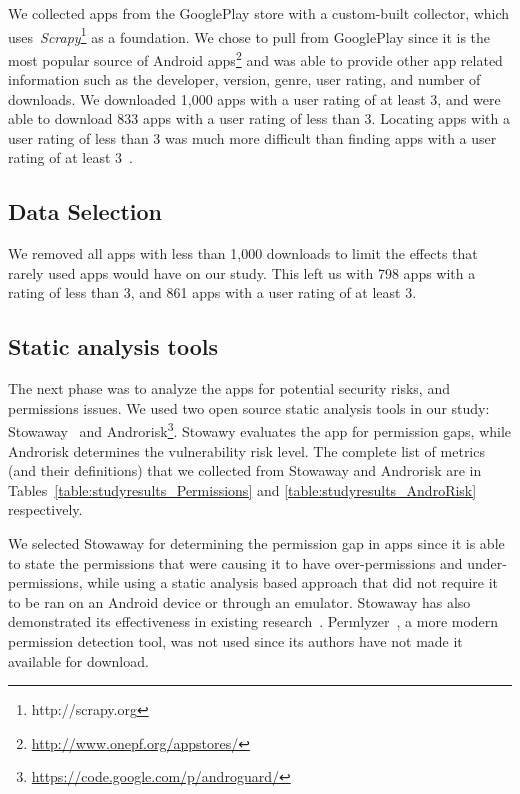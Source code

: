 
We collected apps from the GooglePlay store with a custom-built collector, which uses~\emph{Scrapy}\footnote{http://scrapy.org} as a foundation. We chose to pull from GooglePlay since it is the most popular source of Android apps\footnote{\url{http://www.onepf.org/appstores/}} and was able to provide other app related information such as the developer, version, genre, user rating, and number of downloads. We downloaded 1,000 apps with a user rating of at least 3, and were able to download 833 apps with a user rating of less than 3. Locating apps with a user rating of less than 3 was much more difficult than finding apps with a user rating of at least 3~\cite{mojica2013large}.


\subsection{Data Selection}
We removed all apps with less than 1,000 downloads to limit the effects that rarely used apps would have on our study. This left us with 798 apps with a rating of less than 3, and 861 apps with a user rating of at least 3.


\subsection{Static analysis tools}
\label{sec: analysis}

The next phase was to analyze the apps for potential security risks, and permissions issues. We used two open source static analysis tools in our study: Stowaway~\cite{Felt:2011:APD:2046707.2046779} and Androrisk\footnote{\url{https://code.google.com/p/androguard/}}. Stowawy evaluates the app for permission gaps, while Androrisk determines the vulnerability risk level. The complete list of metrics (and their definitions) that we collected from Stowaway and Androrisk are in Tables~\ref{table:studyresults_Permissions} and \ref{table:studyresults_AndroRisk} respectively.

We selected Stowaway for determining the permission gap in apps since it is able to state the permissions that were causing it to have over-permissions and under-permissions, while using a static analysis based approach that did not require it to be ran on an Android device or through an emulator. Stowaway has also  demonstrated its effectiveness in existing research~\cite{Stevens:2013:APU:2487085.2487093, Felt:2011:APD:2046707.2046779, Pearce:2012:APS:2414456.2414498}. Permlyzer~\cite{6698893}, a more modern permission detection tool, was not used since its authors have not made it available for download.

